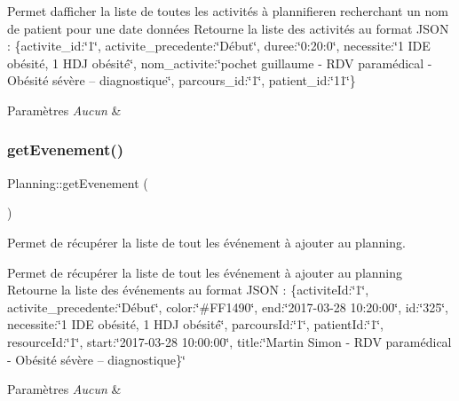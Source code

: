 Permet d\textquotesingle{}afficher la liste de toutes les activités à plannifieren recherchant un nom de patient pour une date données Retourne la liste des activités au format J\+S\+ON \+: \{activite\+\_\+id\+:\char`\"{}1\char`\"{}, activite\+\_\+precedente\+:\char`\"{}\+Début\char`\"{}, duree\+:\char`\"{}0\+:20\+:0\char`\"{}, necessite\+:\char`\"{}1 I\+D\+E obésité, 1 H\+D\+J obésité\char`\"{}, nom\+\_\+activite\+:\char`\"{}pochet guillaume -\/ R\+D\+V paramédical -\/ Obésité sévère – diagnostique\char`\"{}, parcours\+\_\+id\+:\char`\"{}1\char`\"{}, patient\+\_\+id\+:\char`\"{}11\char`\"{}\} 
\begin{DoxyParams}{Paramètres}
{\em Aucun} & \\
\hline
\end{DoxyParams}
\mbox{\label{class_planning_a0e4778f75bae9880dac4dcef097e0196}} 
\subsubsection{\texorpdfstring{get\+Evenement()}{getEvenement()}}
{\footnotesize\ttfamily Planning\+::get\+Evenement (\begin{DoxyParamCaption}{ }\end{DoxyParamCaption})}



Permet de récupérer la liste de tout les événement à ajouter au planning. 

Permet de récupérer la liste de tout les événement à ajouter au planning Retourne la liste des événements au format J\+S\+ON \+: \{activite\+Id\+:\char`\"{}1\char`\"{}, activite\+\_\+precedente\+:\char`\"{}\+Début\char`\"{}, color\+:\char`\"{}\#\+F\+F1490\char`\"{}, end\+:\char`\"{}2017-\/03-\/28 10\+:20\+:00\char`\"{}, id\+:\char`\"{}325\char`\"{}, necessite\+:\char`\"{}1 I\+D\+E obésité, 1 H\+D\+J obésité\char`\"{}, parcours\+Id\+:\char`\"{}1\char`\"{}, patient\+Id\+:\char`\"{}1\char`\"{}, resource\+Id\+:\char`\"{}1\char`\"{}, start\+:\char`\"{}2017-\/03-\/28 10\+:00\+:00\char`\"{}, title\+:\char`\"{}\+Martin Simon -\/ R\+D\+V paramédical -\/ Obésité sévère – diagnostique\}\char`\"{} 
\begin{DoxyParams}{Paramètres}
{\em Aucun} & \\
\hline
\end{DoxyParams}
\mbox{\label{class_planning_a6eb383b4098e8ba4e077e38b580ebc20}} 

